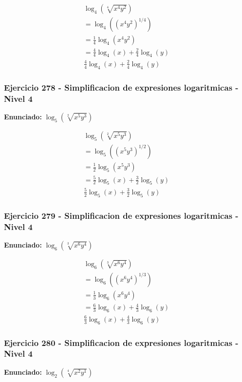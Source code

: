 \documentclass[12pt,a4paper]{article}
\begin{document}
\[
\begin{aligned}
\log_{4}\left(\sqrt[4]{x^{4}y^{2}}\right)\\
=\log_{4}\left((x^{4}y^{2})^{1/4}\right)\\
=\frac{1}{4}\log_{4}\left(x^{4}y^{2}\right) \\
=\frac{4}{4}\log_{4}\left(x\right)+\frac{2}{4}\log_{4}\left(y\right)\\
\boxed{\frac{4}{4}\log_{4}\left(x\right)+\frac{2}{4}\log_{4}\left(y\right)}
\end{aligned}
\]


\subsubsection*{Ejercicio 278 - Simplificacion de expresiones logaritmicas - Nivel 4}
\textbf{Enunciado:} \(\log_{5}\left(\sqrt[2]{x^{5}y^{3}}\right)\)

\[
\begin{aligned}
\log_{5}\left(\sqrt[2]{x^{5}y^{3}}\right)\\
=\log_{5}\left((x^{5}y^{3})^{1/2}\right)\\
=\frac{1}{2}\log_{5}\left(x^{5}y^{3}\right) \\
=\frac{5}{2}\log_{5}\left(x\right)+\frac{3}{2}\log_{5}\left(y\right)\\
\boxed{\frac{5}{2}\log_{5}\left(x\right)+\frac{3}{2}\log_{5}\left(y\right)}
\end{aligned}
\]


\subsubsection*{Ejercicio 279 - Simplificacion de expresiones logaritmicas - Nivel 4}
\textbf{Enunciado:} \(\log_{6}\left(\sqrt[3]{x^{6}y^{4}}\right)\)

\[
\begin{aligned}
\log_{6}\left(\sqrt[3]{x^{6}y^{4}}\right)\\
=\log_{6}\left((x^{6}y^{4})^{1/3}\right)\\
=\frac{1}{3}\log_{6}\left(x^{6}y^{4}\right) \\
=\frac{6}{3}\log_{6}\left(x\right)+\frac{4}{3}\log_{6}\left(y\right)\\
\boxed{\frac{6}{3}\log_{6}\left(x\right)+\frac{4}{3}\log_{6}\left(y\right)}
\end{aligned}
\]


\subsubsection*{Ejercicio 280 - Simplificacion de expresiones logaritmicas - Nivel 4}
\textbf{Enunciado:} \(\log_{2}\left(\sqrt[4]{x^{2}y^{1}}\right)\)
\end{document}
